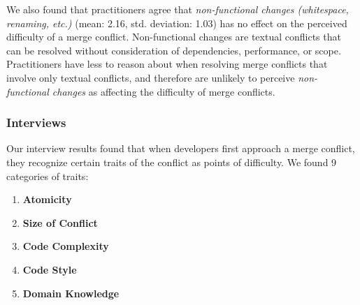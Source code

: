 We also found that practitioners agree that \textit{non-functional changes (whitespace, renaming, etc.)} (mean: 2.16, std. deviation: 1.03) has no effect on the perceived difficulty of a merge conflict.
Non-functional changes are textual conflicts that can be resolved without consideration of dependencies, performance, or scope.
Practitioners have less to reason about when resolving merge conflicts that involve only textual conflicts, and therefore are unlikely to perceive \textit{non-functional changes} as affecting the difficulty of merge conflicts.



\subsubsection{Interviews}

Our interview results found that when developers first approach a merge conflict, they recognize certain traits of the conflict as points of difficulty. We found 9 categories of traits:
\begin{enumerate}
\item \textbf{Atomicity}
\item \textbf{Size of Conflict}
\item \textbf{Code Complexity}
\item \textbf{Code Style}
\item \textbf{Domain Knowledge}
\end{enumerate}


